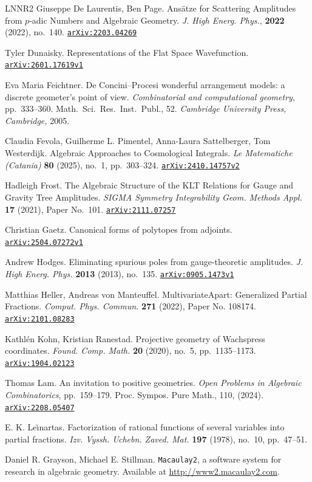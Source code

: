 \documentclass [a4paper,reqno, 11pt]{amsart}
\theoremstyle{plain}
\theoremstyle{plain}
\theoremstyle{plain}
\theoremstyle{plain}
\theoremstyle{definition}
\theoremstyle{definition}
\theoremstyle{definition}
\theoremstyle{definition}
\theoremstyle{definition}
\theoremstyle{definition}
\newcommand{\arxiv}[1]{\href{http://arxiv.org/abs/#1}{{\tt arXiv:#1}}}
\begin{document}
\begin{thebibliography}{LNNR2}
Giuseppe De Laurentis, Ben Page. Ans\"atze for Scattering Amplitudes from $p$-adic Numbers and Algebraic Geometry. \textit{J. High Energ. Phys.}, \textbf{2022} (2022), no.~140. \arxiv{2203.04269}

Tyler Dunaisky. Representations of the Flat Space Wavefunction. \arxiv{2601.17619v1}


Eva Maria Feichtner. De Concini--Procesi wonderful arrangement models: a discrete geometer's point of view. \textit{Combinatorial and computational geometry,} pp.~333--360. Math.~Sci.~Res.~Inst.~Publ., 52. \textit{Cambridge University Press, Cambridge,} 2005.

Claudia Fevola, Guilherme L. Pimentel, Anna-Laura Sattelberger, Tom Westerdijk. Algebraic Approaches to Cosmological Integrals. \textit{Le Matematiche (Catania)} \textbf{80} (2025), no.~1, pp.~303--324. \arxiv{2410.14757v2}

Hadleigh Frost. The Algebraic Structure of the KLT Relations for Gauge and Gravity Tree Amplitudes. \textit{SIGMA Symmetry Integrability Geom. Methods Appl.} \textbf{17} (2021), Paper No.~101. \arxiv{2111.07257}

Christian Gaetz. Canonical forms of polytopes from adjoints. \arxiv{2504.07272v1}

Andrew Hodges. Eliminating spurious poles from gauge-theoretic amplitudes. \textit{J. High Energ. Phys.} \textbf{2013} (2013), no.~135. \arxiv{0905.1473v1}

Matthias Heller, Andreas von Manteuffel. MultivariateApart: Generalized Partial Fractions. \textit{Comput. Phys. Commun.} \textbf{271} (2022), Paper No. 108174. \arxiv{2101.08283}

Kathl\'en Kohn, Kristian Ranestad. Projective geometry of Wachspress coordinates. \textit{Found. Comp. Math.} \textbf{20} (2020), no.~5, pp.~1135--1173. \arxiv{1904.02123}

Thomas Lam. An invitation to positive geometries. \textit{Open Problems in Algebraic Combinatorics}, pp.~159--179. Proc. Sympos. Pure Math., 110, (2024). \arxiv{2208.05407}

E. K. Le\u{\i}nartas. Factorization of rational functions of several variables into partial fractions. \textit{Izv. Vyssh. Uchebn. Zaved. Mat.} \textbf{197} (1978), no.~10, pp.~47--51.

Daniel R. Grayson, Michael E. Stillman. \texttt{Macaulay2}, a software system for research in algebraic geometry. Available at \url{http://www2.macaulay2.com}.


\end{thebibliography}
\end{document}
